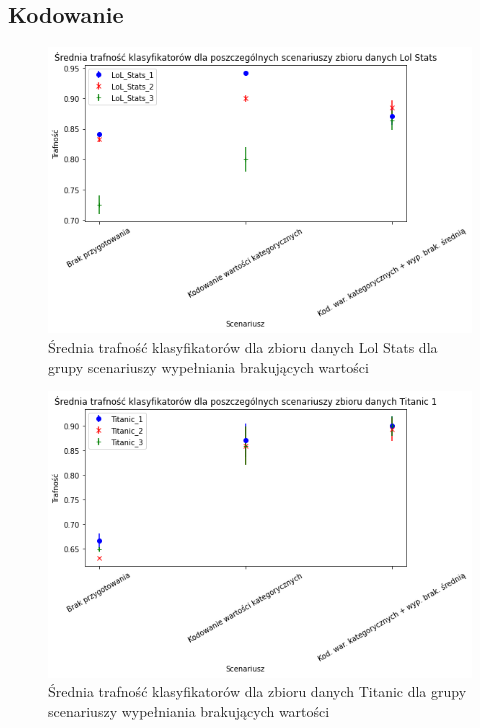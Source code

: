 \documentclass{book}
\begin{document}
\subsection{Kodowanie}

\begin{figure}[H]
    \centerline{\includegraphics[scale=0.5]{Lol_Stats_Avg_Kodowanie}}
    \centering
    \caption{Średnia trafność klasyfikatorów dla zbioru danych Lol Stats 
    dla grupy scenariuszy wypełniania brakujących wartości}
    \end{figure}

\begin{figure}[H]
    \centerline{\includegraphics[scale=0.5]{Titanic_Avg_Kodowanie}}
    \centering
    \caption{Średnia trafność klasyfikatorów dla zbioru danych Titanic 
    dla grupy scenariuszy wypełniania brakujących wartości}
    \end{figure}
\end{document}
